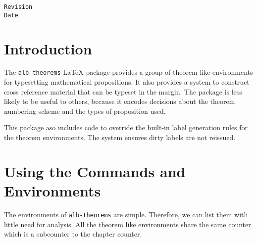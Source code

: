 \documentclass[11pt,a4paper,oneside,titlepage]{alb-corp}
\begin{document}
\begin{albTitlePage}

  \verb$Revision$\\
  \verb$Date$

\end{albTitlePage}




\section{Introduction}
\label{sec:alb-theorems-documentation:intr}

The \texttt{alb-theorems} \LaTeX{} package provides a group of theorem
like environments for typesetting mathematical propositions.  It also
provides a system to construct cross reference material that can be
typeset in the margin.  The package is less likely to be useful to
others, because it encodes decisions about the theorem numbering scheme
and the types of proposition used.

This package aso includes \AUCTeX{} code to override the built-in label
generation rules for the theorem environments.  The system ensures dirty
labels are not reissued.




\section{Using the Commands and Environments}
\label{sec:alb-theorems-documentation:using-comm-envir}

The environments of \texttt{alb-theorems} are simple.  Therefore, we can
list them with little need for analysis.  All the theorem like
environments share the same counter which is a subcounter to the chapter
counter.
\end{document}
